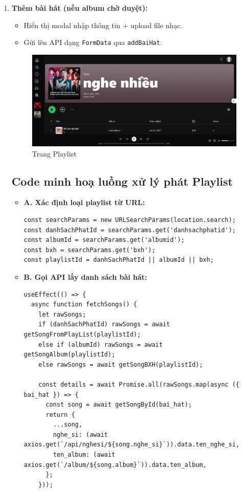 \begin{enumerate}
  \item \textbf{Thêm bài hát (nếu album chờ duyệt):}
  \begin{itemize}
    \item Hiển thị modal nhập thông tin + upload file nhạc.
    \item Gửi lên API dạng \texttt{FormData} qua \texttt{addBaiHat}.
  \end{itemize}
  \begin{figure}[H]
    \centering
    \includegraphics[width=1\textwidth]{imgs/trienkhaife/playlist.png}
    \caption{Trang Playlist}
  \end{figure}
  \subsection*{Code minh hoạ luồng xử lý phát Playlist}

\begin{itemize}
  \item \textbf{A. Xác định loại playlist từ URL:}
\begin{verbatim}
const searchParams = new URLSearchParams(location.search);
const danhSachPhatId = searchParams.get('danhsachphatid');
const albumId = searchParams.get('albumid');
const bxh = searchParams.get('bxh');
const playlistId = danhSachPhatId || albumId || bxh;
\end{verbatim}

  \item \textbf{B. Gọi API lấy danh sách bài hát:}
\begin{verbatim}
useEffect(() => {
  async function fetchSongs() {
    let rawSongs;
    if (danhSachPhatId) rawSongs = await getSongFromPlayList(playlistId);
    else if (albumId) rawSongs = await getSongAlbum(playlistId);
    else rawSongs = await getSongBXH(playlistId);

    const details = await Promise.all(rawSongs.map(async ({ bai_hat }) => {
      const song = await getSongById(bai_hat);
      return {
        ...song,
        nghe_si: (await axios.get(`/api/nghesi/${song.nghe_si}`)).data.ten_nghe_si,
        ten_album: (await axios.get(`/album/${song.album}`)).data.ten_album,
      };
    }));


\end{verbatim}
\end{itemize}
\end{enumerate}
